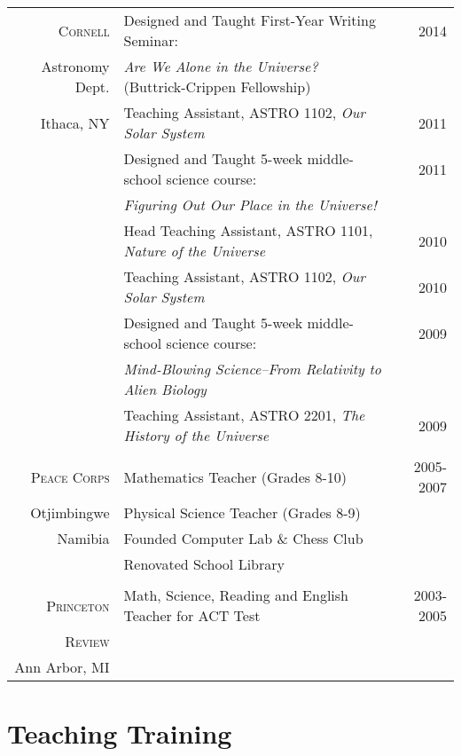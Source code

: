 \documentclass[10pt]{article} %
\begin{document}
\begin{tabular}{>{\hfill}r|p{11cm}r}

\textsc{Cornell} & Designed and Taught First-Year Writing Seminar: & 2014 \\
Astronomy Dept.& \hspace{0.25cm} {\it Are We Alone in the Universe?} (Buttrick-Crippen Fellowship) \\
Ithaca, NY & Teaching Assistant, ASTRO 1102, {\it Our Solar System} & 2011 \\
& Designed and Taught 5-week middle-school science course: & 2011\\
& \hspace{0.25cm} {\it Figuring Out Our Place in the Universe!} \\
& Head Teaching Assistant, ASTRO 1101, {\it Nature of the Universe} & 2010\\
& Teaching Assistant, ASTRO 1102, {\it Our Solar System} & 2010 \\
& Designed and Taught 5-week middle-school science course: & 2009\\
& \hspace{0.25cm} {\it Mind-Blowing Science--From Relativity to Alien Biology} \\
& Teaching Assistant, ASTRO 2201, {\it The History of the Universe} & 2009 \\
\multicolumn{3}{c}{} \\

\textsc{Peace Corps} & Mathematics Teacher (Grades 8-10) & 2005-2007\\
Otjimbingwe & Physical Science Teacher (Grades 8-9) \\
Namibia& Founded Computer Lab \& Chess Club \\
& Renovated School Library \\
\multicolumn{2}{c}{} \\

\textsc{Princeton} & Math, Science, Reading and English Teacher for ACT Test & 2003-2005\\
\textsc{Review} \\
Ann Arbor, MI
\end{tabular}


\section{Teaching Training}
\end{document}
